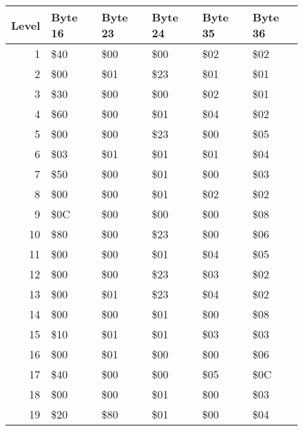 \begin{figure}[H]
  {
  \setlength{\tabcolsep}{3.0pt}
  \setlength\cmidrulewidth{\heavyrulewidth} %
  \begin{adjustbox}{width=\textwidth}

\begin{tabular}{rlllll}
\toprule
   Level & Byte 16   & Byte 23   & Byte 24   & Byte 35   & Byte 36   \\
\midrule
       1 & \$40       & \$00       & \$00       & \$02       & \$02       \\
       2 & \$00       & \$01       & \$23       & \$01       & \$01       \\
       3 & \$30       & \$00       & \$00       & \$02       & \$01       \\
       4 & \$60       & \$00       & \$01       & \$04       & \$02       \\
       5 & \$00       & \$00       & \$23       & \$00       & \$05       \\
       6 & \$03       & \$01       & \$01       & \$01       & \$04       \\
       7 & \$50       & \$00       & \$01       & \$00       & \$03       \\
       8 & \$00       & \$00       & \$01       & \$02       & \$02       \\
       9 & \$0C       & \$00       & \$00       & \$00       & \$08       \\
      10 & \$80       & \$00       & \$23       & \$00       & \$06       \\
      11 & \$00       & \$00       & \$01       & \$04       & \$05       \\
      12 & \$00       & \$00       & \$23       & \$03       & \$02       \\
      13 & \$00       & \$01       & \$23       & \$04       & \$02       \\
      14 & \$00       & \$00       & \$01       & \$00       & \$08       \\
      15 & \$10       & \$01       & \$01       & \$03       & \$03       \\
      16 & \$00       & \$01       & \$00       & \$00       & \$06       \\
      17 & \$40       & \$00       & \$00       & \$05       & \$0C       \\
      18 & \$00       & \$00       & \$01       & \$00       & \$03       \\
      19 & \$20       & \$80       & \$01       & \$00       & \$04       \\

\end{tabular}
\end{adjustbox}}
\end{figure}
